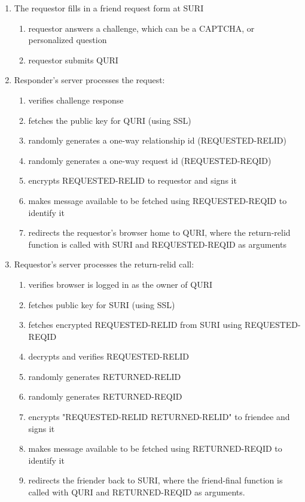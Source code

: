 \documentclass[letterpaper,11pt,oneside]{article}
\begin{document}
\begin{enumerate}
\item The requestor fills in a friend request form at SURI
    \begin{enumerate}
    \item requestor answers a challenge, which can be a CAPTCHA, or 
            personalized question
    \item requestor submits QURI
    \end{enumerate}

\item Responder's server processes the request:
    \begin{enumerate}
    \item verifies challenge response
    \item fetches the public key for QURI (using SSL)
    \item randomly generates a one-way relationship id (REQUESTED-RELID)
    \item randomly generates a one-way request id (REQUESTED-REQID)
    \item encrypts REQUESTED-RELID to requestor and signs it
    \item makes message available to be fetched using REQUESTED-REQID to identify it
    \item redirects the requestor's browser home to QURI, where the return-relid 
        function is called with SURI and REQUESTED-REQID as arguments
    \end{enumerate}

\item Requestor's server processes the return-relid call:
    \begin{enumerate}
    \item verifies browser is logged in as the owner of QURI
    \item fetches public key for SURI (using SSL)
    \item fetches encrypted REQUESTED-RELID from SURI using REQUESTED-REQID
    \item decrypts and verifies REQUESTED-RELID
    \item randomly generates RETURNED-RELID
    \item randomly generates RETURNED-REQID
    \item encrypts "REQUESTED-RELID RETURNED-RELID" to friendee and signs it
    \item makes message available to be fetched using RETURNED-REQID to identify it
    \item redirects the friender back to SURI, where the friend-final function is called
    with QURI and RETURNED-REQID as arguments.
    \end{enumerate}


\end{enumerate}
\end{document}
